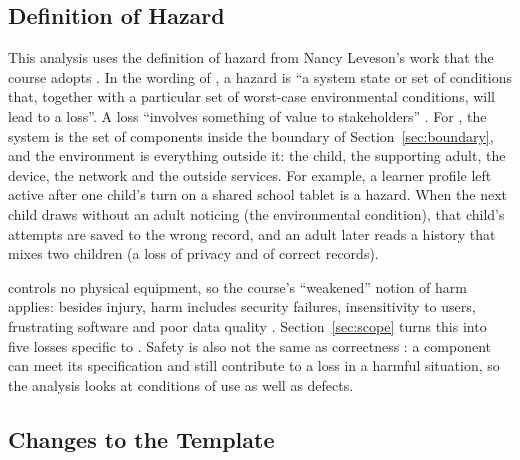 \documentclass{article}
\begin{document}
\subsection{Definition of Hazard}

This analysis uses the definition of hazard from Nancy Leveson's work that the
course adopts \citep{Smith2026L08}. In the wording of
\citet[p.~17]{LevesonAndThomas2018}, a hazard is ``a system state or set of
conditions that, together with a particular set of worst-case environmental
conditions, will lead to a loss''. A loss ``involves something of value to
stakeholders'' \citep[p.~16]{LevesonAndThomas2018}. For \progname{}, the system
is the set of components inside the boundary of Section~\ref{sec:boundary}, and
the environment is everything outside it: the child, the supporting adult, the
device, the network and the outside services. For example, a learner profile
left active after one child's turn on a shared school tablet is a hazard. When
the next child draws without an adult noticing (the environmental condition),
that child's attempts are saved to the wrong record, and an adult later reads a
history that mixes two children (a loss of privacy and of correct records).

\progname{} controls no physical equipment, so the course's ``weakened'' notion
of harm applies: besides injury, harm includes security failures, insensitivity
to users, frustrating software and poor data quality \citep{Smith2026L08}.
Section~\ref{sec:scope} turns this into five losses specific to \progname{}.
Safety is also not the same as correctness \citep{Smith2026L08}: a component can
meet its specification and still contribute to a loss in a harmful situation, so
the analysis looks at conditions of use as well as defects.

\subsection{Changes to the Template}
\end{document}
